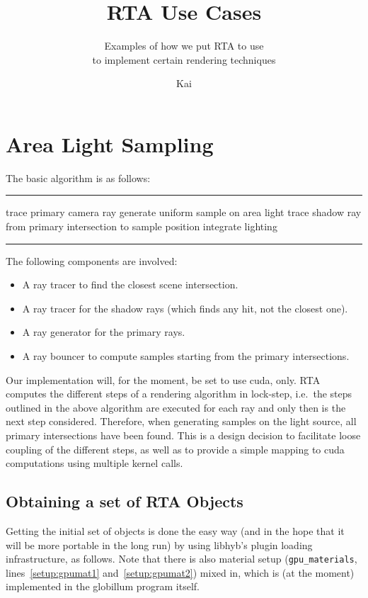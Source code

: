 \documentclass[a4paper,11pt]{scrartcl}
\title{RTA Use Cases}
\subtitle{Examples of how we put RTA to use \\to implement certain rendering techniques}
\author{Kai}
\newenvironment{alg}{
	\medskip\hrule
	\begin{algorithmic}}
	{\end{algorithmic}
	\hrule\medskip}
\begin{document}
\maketitle\thispagestyle{empty}

\section{Area Light Sampling}
The basic algorithm is as follows:

\begin{alg}
\State trace primary camera ray
	\State generate uniform sample on area light
	\State trace shadow ray from primary intersection to sample position
	\State integrate lighting
\EndFor
\end{alg}

The following components are involved:
\begin{itemize}
\item A ray tracer to find the closest scene intersection.
\item A ray tracer for the shadow rays (which finds any hit, not the closest one).
\item A ray generator for the primary rays.
\item A ray bouncer to compute samples starting from the primary intersections.
\end{itemize}

Our implementation will, for the moment, be set to use cuda, only.
RTA computes the different steps of a rendering algorithm in lock-step, 
	i.e.\ the steps outlined in the above algorithm are executed for each ray and only then is the next step considered.
Therefore, when generating samples on the light source, all primary intersections have been found.
This is a design decision to facilitate loose coupling of the different steps, 
	as well as to provide a simple mapping to cuda computations using multiple kernel calls.

\subsection{Obtaining a set of RTA Objects}
Getting the initial set of objects is done the easy way (and in the hope that it will be more portable in the long run)
	by using libhyb's plugin loading infrastructure, as follows.
Note that there is also material setup (\lstinline|gpu_materials|, lines~\ref{setup:gpumat1} and~\ref{setup:gpumat2}) mixed in, 
	which is (at the moment) implemented in the globillum program itself.
\end{document}

